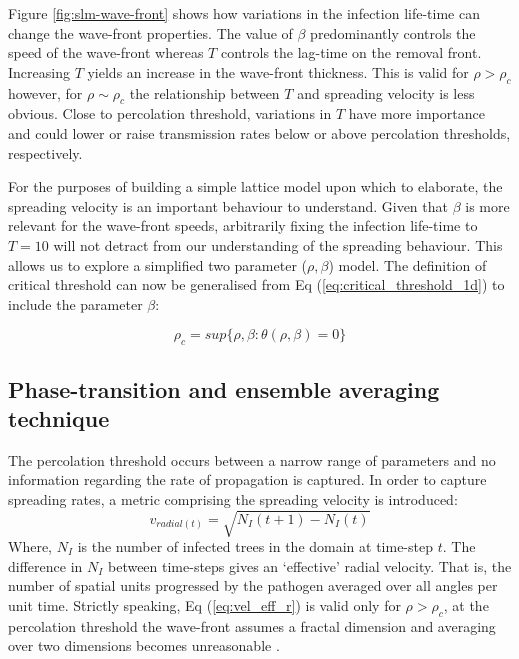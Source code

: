 Figure \ref{fig:slm-wave-front} shows how variations in the infection life-time can change the wave-front properties. %
The value of $\beta$ predominantly controls the speed of the  wave-front whereas $T$ controls the lag-time on the removal front. %
Increasing  $T$ yields an  increase in the wave-front thickness. %
This is valid for $\rho > \rho_c$ however, for $\rho \sim \rho_c$ the relationship between $T$ and spreading velocity is less obvious. %
Close to percolation threshold, variations in $T$ have more importance and could lower or raise transmission rates below or above percolation thresholds, respectively. %

For the purposes of building a simple lattice model upon which to elaborate, the spreading velocity is an important behaviour to understand. %
Given that $\beta$ is more relevant for the wave-front speeds, arbitrarily fixing the infection life-time to $T=10$ will not detract from our understanding of the spreading behaviour. %
This allows us to explore a simplified two parameter ($\rho, \beta$) model. %
The definition of critical threshold can now be generalised from Eq (\ref{eq:critical_threshold_1d}) to include the parameter $\beta$: %

\begin{equation}
\label{eq:critical_threshold_1d}
    \rho _{c}=sup \lbrace \rho, \beta : \theta (\rho, \beta ) = 0 \rbrace
\end{equation}

\subsection{Phase-transition and ensemble averaging technique}

The percolation threshold occurs between a narrow range of parameters and no information regarding the rate of propagation is captured. %
In order to capture spreading rates, a metric comprising the spreading velocity is introduced: %
\begin{equation}
\label{eq:vel_eff_r}
    v_{radial(t)}=\sqrt{N_I(t+1)-N_I(t)}
\end{equation} 
Where, $N_I$ is the number of infected trees in the domain at time-step $t$. %
The difference in $N_I$ between time-steps gives an `effective' radial velocity. %
That is, the number of spatial units progressed by the pathogen averaged over all angles per unit time. %
Strictly speaking, Eq (\ref{eq:vel_eff_r}) is valid only for $\rho > \rho_c$, %
at the percolation threshold the wave-front assumes a fractal dimension and averaging over two dimensions becomes unreasonable \citep[see][for more information]{OROZCOFUENTES201912}. %

